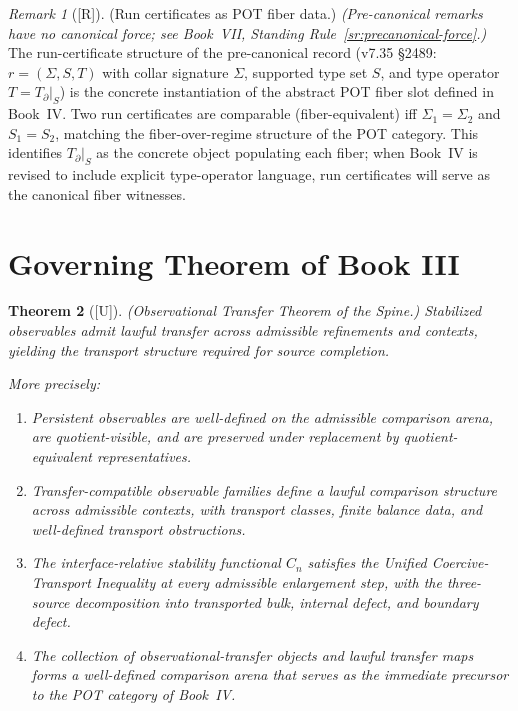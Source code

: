 \documentclass[12pt,oneside]{amsbook}
\theoremstyle{plain}
\newtheorem{theorem}{Theorem}[section]
\theoremstyle{definition}
\theoremstyle{remark}
\newtheorem{remark}[theorem]{Remark}
\newcommand{\status}[1]{\textup{[#1]}}
\begin{document}
\begin{remark}[\status{R}]
\textup{(Run certificates as POT fiber data.)}
\textit{(Pre-canonical remarks have no canonical force;
see Book~VII, Standing Rule~\ref{sr:precanonical-force}.)}  
The run-certificate structure of the pre-canonical record (v7.35
\S2489: $r = (\Sigma, S, T)$ with collar signature $\Sigma$, supported
type set $S$, and type operator $T = T_\partial|_S$) is the concrete
instantiation of the abstract POT fiber slot defined in
Book~IV.  Two run certificates are comparable (fiber-equivalent) iff
$\Sigma_1 = \Sigma_2$ and $S_1 = S_2$, matching the fiber-over-regime
structure of the POT category.  This identifies $T_\partial|_S$ as
the concrete object populating each fiber; when Book~IV is revised to
include explicit type-operator language, run certificates will serve
as the canonical fiber witnesses.
\end{remark}

\section{Governing Theorem of Book III}

\begin{theorem}[\status{U}]\label{thm:governing}
\textup{(Observational Transfer Theorem of the Spine.)}  Stabilized
observables admit lawful transfer across admissible refinements and
contexts, yielding the transport structure required for source
completion.

More precisely:
\begin{enumerate}[label=\textup{(\alph*)}]
  \item\label{thm:gov-persist}
        Persistent observables are well-defined on the admissible
        comparison arena, are quotient-visible, and are preserved
        under replacement by quotient-equivalent representatives.
  \item\label{thm:gov-transfer}
        Transfer-compatible observable families define a lawful
        comparison structure across admissible contexts, with
        transport classes, finite balance data, and well-defined
        transport obstructions.
  \item\label{thm:gov-ineq}
        The interface-relative stability functional $C_n$ satisfies
        the Unified Coercive-Transport Inequality at every admissible
        enlargement step, with the three-source decomposition into
        transported bulk, internal defect, and boundary defect.
  \item\label{thm:gov-OT}
        The collection of observational-transfer objects and lawful
        transfer maps forms a well-defined comparison arena that
        serves as the immediate precursor to the POT category of
        Book~IV.
\end{enumerate}
\end{theorem}
\end{document}
